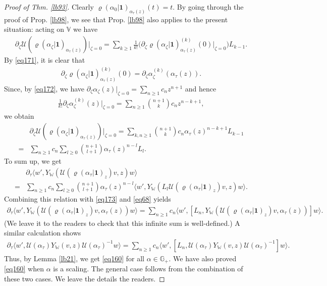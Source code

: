 \documentclass[12pt,a4paper,notitlepage]{article}
\theoremstyle{definition}
\theoremstyle{plain}
\newcommand{\mc}{\mathcal}
\newcommand{\id}{\mathbf{1}}
\newcommand{\bigbk}[1]{\big\langle {#1}\big\rangle}
\newcommand{\Vbb}{\mathbb V}
\newcommand{\Wbb}{\mathbb W}
\newcommand{\Gbb}{\mathbb G}
\numberwithin{equation}{section}
\begin{document}
\begin{proof}[Proof of Thm. \ref{lb93}]
Clearly $\varrho(\alpha_0|\id)_{\alpha_\tau(z)}(t)=t$. By going through the proof of Prop. \ref{lb98}, we see that Prop. \ref{lb98} also applies to the present situation: acting on $\Vbb$ we have
\begin{align}
\partial_\zeta\mc U(\varrho(\alpha_\zeta|\id)_{\alpha_\tau(z)})\Big|_{\zeta=0}=\sum_{k\geq 1}\frac 1{k!}\Big(\partial_\zeta\varrho(\alpha_\zeta|\id)_{\alpha_\tau(z)}^{(k)}(0)\Big|_{\zeta=0} \Big)L_{k-1}.	
\end{align}
By \eqref{eq171}, it is clear that
\begin{align*}
\partial_\zeta\varrho(\alpha_\zeta|\id)_{\alpha_\tau(z)}^{(k)}(0)=\partial_\zeta\alpha_\zeta^{(k)}(\alpha_\tau(z)).	
\end{align*}
Since, by \eqref{eq172}, we have $\partial_\zeta\alpha_\zeta(z)\big|_{\zeta=0}=\sum_{n\ge 1}c_nz^{n+1}$ and hence
\begin{align*}
\frac 1{k!}\partial_\zeta\alpha_\zeta^{(k)}(z)\big|_{\zeta=0}=\sum_{n\geq 1}{n+1\choose k}c_nz^{n-k+1},	
\end{align*}
we obtain
\begin{align}
&\partial_\zeta\mc U(\varrho(\alpha_\zeta|\id)_{\alpha_\tau(z)})\Big|_{\zeta=0}=\sum_{k,n\geq 1}{n+1\choose k}c_n\alpha_\tau(z)^{n-k+1}L_{k-1}\nonumber\\
=&\sum_{n\geq 1}c_n\sum_{l\geq 0}{n+1\choose l+1}\alpha_\tau(z)^{n-l}L_l.
\end{align}
To sum up, we get
\begin{align}
&\partial_\tau\bigbk{w',Y_\Wbb(\mc U(\varrho(\alpha_\tau|\id)_z)v,z)w}\nonumber\\
=&	\sum_{n\geq 1}c_n\sum_{l\geq 0}{n+1\choose l+1}\alpha_\tau(z)^{n-l}\bigbk{w',Y_\Wbb(L_l\mc U(\varrho(\alpha_\tau|\id)_z)v,z)w}.
\end{align}
Combining this relation with \eqref{eq173} and \eqref{eq68} yields
\begin{align}
\partial_\tau\bigbk{w',Y_\Wbb(\mc U(\varrho(\alpha_\tau|\id)_z)v,\alpha_\tau(z))w}=\sum_{n\geq 1}c_n	\bigbk{w',[L_n,Y_\Wbb(\mc U(\varrho(\alpha_\tau|\id)_z)v,\alpha_\tau(z))]w}.
\end{align}
(We leave it to the readers to check that this infinite sum is well-defined.) A similar calculation shows
\begin{align}
\partial_\tau\bigbk{w',\mc U(\alpha_\tau)Y_\Wbb(v,z)\mc U(\alpha_\tau)^{-1}w}=\sum_{n\geq 1}c_n	\bigbk{w',[L_n,\mc U(\alpha_\tau)Y_\Wbb(v,z)\mc U(\alpha_\tau)^{-1}]w}.
\end{align}
Thus, by Lemma \ref{lb21}, we get \eqref{eq160} for all $\alpha\in\Gbb_+$. We have also proved \eqref{eq160} when $\alpha$ is a scaling. The general case follows from the combination of these two cases. We leave the details the readers. 
\end{proof}
\end{document}
